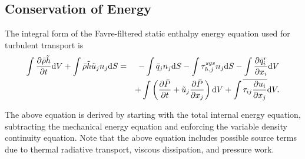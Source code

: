 \subsection{Conservation of Energy}

The integral form of the Favre-filtered static enthalpy energy equation used for
turbulent transport is
%
\begin{eqnarray}
   \int {{\partial \bar{\rho} \tilde{h}} \over {\partial t}} {\rm d}V
  + \int \bar{\rho} \tilde{h} \tilde{u}_j n_j {\rm d}S 
  &=& - \int \bar{q}_j n_j {\rm d}S
  -\int \tau^{sgs}_{h,j} n_j {\rm d}S 
  - \int {{\partial \bar{q}_i^r} \over {\partial x_i}} {\rm d}V \nonumber \\
  && + \int \left({{\partial \bar{P}} \over {\partial t}} + \tilde{u}_j {{\partial \bar{P}} \over {\partial x_j}}\right){\rm d}V
  + \int \overline{\tau_{ij} {{\partial u_i} \over {\partial x_j }}} {\rm d}V.
\label{fav-enth}
\end{eqnarray}
%

The above equation is derived by starting with the total internal energy
equation, subtracting the mechanical energy equation and enforcing the
variable density continuity equation. Note that the above equation includes
possible source terms due to thermal radiative transport, viscous dissipation,
and pressure work.


